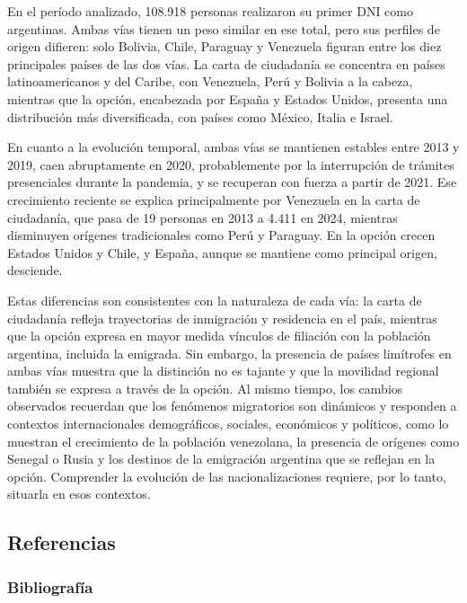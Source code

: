 \documentclass[
  letterpaper,
  DIV=11,
  numbers=noendperiod]{scrartcl}
\begin{document}
En el período analizado, 108.918 personas realizaron su primer DNI como
argentinas. Ambas vías tienen un peso similar en ese total, pero sus
perfiles de origen difieren: solo Bolivia, Chile, Paraguay y Venezuela
figuran entre los diez principales países de las dos vías. La carta de
ciudadanía se concentra en países latinoamericanos y del Caribe, con
Venezuela, Perú y Bolivia a la cabeza, mientras que la opción,
encabezada por España y Estados Unidos, presenta una distribución más
diversificada, con países como México, Italia e Israel.

En cuanto a la evolución temporal, ambas vías se mantienen estables
entre 2013 y 2019, caen abruptamente en 2020, probablemente por la
interrupción de trámites presenciales durante la pandemia, y se
recuperan con fuerza a partir de 2021. Ese crecimiento reciente se
explica principalmente por Venezuela en la carta de ciudadanía, que pasa
de 19 personas en 2013 a 4.411 en 2024, mientras disminuyen orígenes
tradicionales como Perú y Paraguay. En la opción crecen Estados Unidos y
Chile, y España, aunque se mantiene como principal origen, desciende.

Estas diferencias son consistentes con la naturaleza de cada vía: la
carta de ciudadanía refleja trayectorias de inmigración y residencia en
el país, mientras que la opción expresa en mayor medida vínculos de
filiación con la población argentina, incluida la emigrada. Sin embargo,
la presencia de países limítrofes en ambas vías muestra que la
distinción no es tajante y que la movilidad regional también se expresa
a través de la opción. Al mismo tiempo, los cambios observados recuerdan
que los fenómenos migratorios son dinámicos y responden a contextos
internacionales demográficos, sociales, económicos y políticos, como lo
muestran el crecimiento de la población venezolana, la presencia de
orígenes como Senegal o Rusia y los destinos de la emigración argentina
que se reflejan en la opción. Comprender la evolución de las
nacionalizaciones requiere, por lo tanto, situarla en esos contextos.

\subsection{Referencias}\label{referencias}

\subsubsection{Bibliografía}\label{bibliografuxeda}
\end{document}
